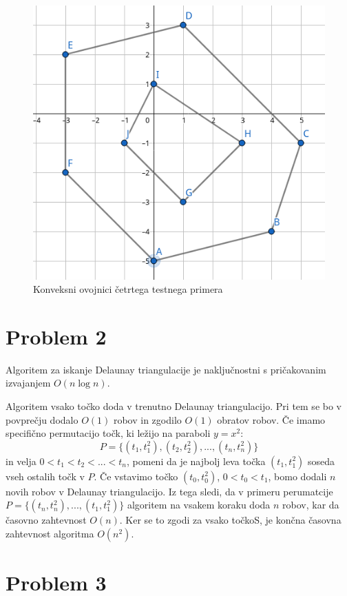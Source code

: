 \documentclass{article}
\begin{document}
\begin{figure}
	\centering
	\includegraphics[scale=0.4]{./figs/test04.png}
	\caption{Konveksni ovojnici četrtega testnega primera}
	\label{fig:test04}
\end{figure}

\section{Problem 2}

Algoritem za iskanje Delaunay triangulacije je naključnostni s pričakovanim
izvajanjem $O(n\log n)$.

Algoritem vsako točko doda v trenutno Delaunay triangulacijo. Pri tem se bo v
povprečju dodalo $O(1)$ robov in zgodilo $O(1)$ obratov robov. Če imamo
specifično permutacijo točk, ki ležijo na paraboli $y = x^2$:
\begin{equation*}
	P = \{ (t_1, t_1^2), (t_2, t_2^2), ..., (t_n, t_n^2) \}
\end{equation*}
in velja $ 0 < t_1 < t_2 < ... < t_n$, pomeni da je najbolj leva točka $(t_1,
t_1^2)$ soseda vseh ostalih točk v $P$. Če vstavimo točko $(t_0, t_0^2)$, $0 <
t_0 < t_1$, bomo dodali $n$ novih robov v Delaunay triangulacijo. Iz tega sledi,
da v primeru perumatcije $P = \{ (t_n, t_n^2), ..., (t_1, t_1^2) \}$ algoritem
na vsakem koraku doda $n$ robov, kar da časovno zahtevnost $O(n)$. Ker se to
zgodi za vsako točkoS, je končna časovna zahtevnost algoritma $O(n^2)$.

\section{Problem 3}





\end{document}
